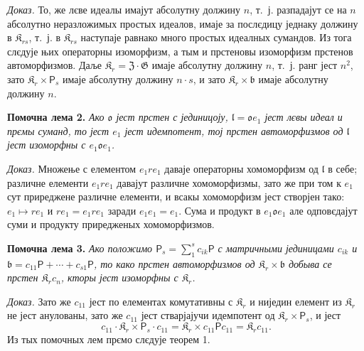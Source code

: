 \documentclass[11pt]{article}
\begin{document}
\noindent\emph{Доказ.} То, же лєве идеалы имајут абсолутну должину \(n\), т.~ј. разпадајут се на \(n\) абсолутно неразложимых простых идеалов, имаје за послєдицу једнаку должину в \(\mathfrak K_{rs}\), т.~ј. в \(\mathfrak K_{rs}\) наступаје равнако много простых идеалных сумандов. Из тога слєдује њих операторны изоморфизм, а тым и прстеновы изоморфизм прстенов автоморфизмов. Даље \(\mathfrak K_r=\mathfrak Z\cdot\mathfrak G\) имаје абсолутну должину \(n\), т.~ј. ранг јест \(n^2\), зато \(\mathfrak K_r\times \mathsf{P}_s\) имаје абсолутну должину \(n\cdot s\), и зато \(\mathfrak K_r\times\mathfrak b\) имаје абсолутну должину \(n\).

\noindent\textbf{Помочна лема 2.} \emph{Ако \(\mathfrak o\) јест прстен с јединицоју, \(\mathfrak l=\mathfrak o e_1\) јест лєвы идеал и прємы суманд, то јест \(e_1\) јест идемпотент, тој прстен автоморфизмов од \(\mathfrak l\) јест изоморфны с \(e_1\mathfrak o e_1\).}

\noindent\emph{Доказ.} Множење с елементом \(e_1re_1\) даваје операторны хомоморфизм од \(\mathfrak l\) в себе; различне елементи \(e_1re_1\) давајут различне хомоморфизмы, зато же при том к \(e_1\) сут приреджене различне елементи, и всакы хомоморфизм јест створјен тако: \(e_1\mapsto re_1\) и \(re_1=e_1re_1\) заради \(e_1e_1=e_1\). Сума и продукт в \(e_1\mathfrak o e_1\) але одповєдајут суми и продукту приредженых хомоморфизмов.

\noindent\textbf{Помочна лема 3.} \emph{Ако положимо \(\mathsf{P}_s=\sum_1^s c_{ik}\mathsf{P}\) с матричными јединицами \(c_{ik}\) и \(\mathfrak b=c_{11}\mathsf{P}+\cdots+c_{s1}\mathsf{P}\), то како прстен автоморфизмов од \(\mathfrak K_r\times\mathfrak b\) добыва се прстен \(\mathfrak K_rc_n\), кторы јест изоморфны с \(\mathfrak K_r\).}

\noindent\emph{Доказ.} Зато же \(c_{11}\) јест по елементах комутативны с \(\mathfrak K_r\) и ниједин елемент из \(\mathfrak K_r\) не јест анулованы, зато же \(c_{11}\) јест стварјајучи идемпотент од \(\mathfrak K_r\times \mathsf{P}_s\), и јест
\[
c_{11}\cdot\mathfrak K_r\times \mathsf{P}_s\cdot c_{11}
=\mathfrak K_r\times c_{11}\mathsf Pc_{11}
=\mathfrak K_rc_{11}.
\]
Из тых помочных лем прємо слєдује теорем 1.
\end{document}
